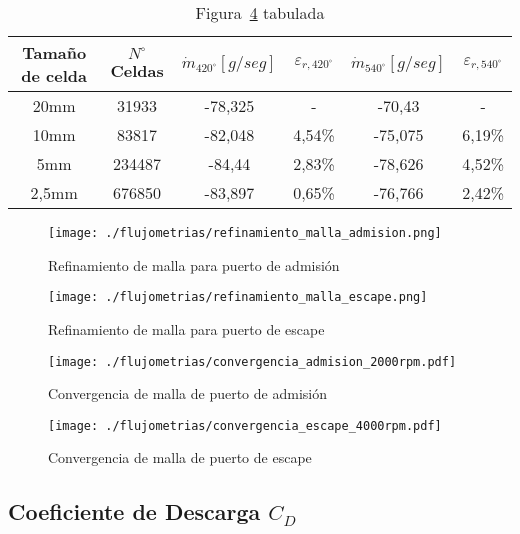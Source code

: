 \begin{table}
  \centering
  \begin{tabular}{cccccc}\toprule
    Tamaño de celda & $N^{\circ}$ Celdas & $\dot{m}_{420^{\circ}} [g/seg]$ & $\varepsilon_{r,420^{\circ}}$ & $\dot{m}_{540^{\circ}} [g/seg]$ & $\varepsilon_{r,540^{\circ}}$ \\ \midrule
    20mm  & 31933  & -78,325 & - & -70,43 & - \\
    10mm  & 83817  & -82,048 & 4,54\% & -75,075 & 6,19\% \\
    5mm   & 234487 & -84,44  & 2,83\% & -78,626 & 4,52\% \\
    2,5mm & 676850 & -83,897 & 0,65\% & -76,766 & 2,42\% \\ \bottomrule
  \end{tabular}
  \caption{Figura~\ref{fig:conv_malla_escape} tabulada}\label{tab:convergencia_malla_escape}
\end{table}

\begin{figure}
  \centering
  \texttt{[image: ./flujometrias/refinamiento\_malla\_admision.png]}
  \caption{Refinamiento de malla para puerto de admisión}\label{fig:refinamiento_admision}
\end{figure}

\begin{figure}
  \centering
  \texttt{[image: ./flujometrias/refinamiento\_malla\_escape.png]}
  \caption{Refinamiento de malla para puerto de escape}\label{fig:refinamiento_escape}
\end{figure}

\begin{figure}
  \centering
  \texttt{[image: ./flujometrias/convergencia\_admision\_2000rpm.pdf]}
  \caption{Convergencia de malla de puerto de admisión}\label{fig:conv_malla_admision}
\end{figure}

\begin{figure}
  \centering
  \texttt{[image: ./flujometrias/convergencia\_escape\_4000rpm.pdf]}
  \caption{Convergencia de malla de puerto de escape}\label{fig:conv_malla_escape}
\end{figure}


\subsection{Coeficiente de Descarga $C_{D}$}\label{sec:cap2_cd}

